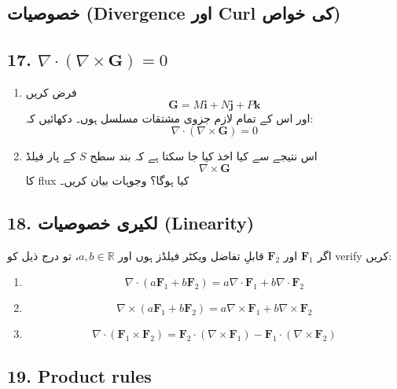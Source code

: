 \begin{enumerate}
\section*{خصوصیات (Divergence اور Curl کی خواص)}

\subsection*{17. \(\nabla \cdot (\nabla \times \mathbf{G}) = 0\)}

\begin{enumerate}
\item[a.] فرض کریں
\[
\mathbf{G} = M\mathbf{i} + N\mathbf{j} + P\mathbf{k}
\]
اور اس کے تمام لازم جزوی مشتقات مسلسل ہوں۔ دکھائیں کہ:
\[
\nabla \cdot (\nabla \times \mathbf{G}) = 0
\]

\item[b.] اس نتیجے سے کیا اخذ کیا جا سکتا ہے کہ بند سطح \( S \) کے پار فیلڈ
\[
\nabla \times \mathbf{G}
\]
کا flux کیا ہوگا؟ وجوہات بیان کریں۔
\end{enumerate}

\bigskip

\subsection*{18. لکیری خصوصیات (Linearity)}

اگر \( \mathbf{F}_1 \) اور \( \mathbf{F}_2 \) قابلِ تفاضل ویکٹر فیلڈز ہوں اور \( a,b \in \mathbb{R} \)، تو درج ذیل کو verify کریں:

\begin{enumerate}
\item[a.]
\[
\nabla \cdot (a\mathbf{F}_1 + b\mathbf{F}_2)
=
a\nabla \cdot \mathbf{F}_1 + b\nabla \cdot \mathbf{F}_2
\]

\item[b.]
\[
\nabla \times (a\mathbf{F}_1 + b\mathbf{F}_2)
=
a\nabla \times \mathbf{F}_1 + b\nabla \times \mathbf{F}_2
\]

\item[c.]
\[
\nabla \cdot (\mathbf{F}_1 \times \mathbf{F}_2)
=
\mathbf{F}_2 \cdot (\nabla \times \mathbf{F}_1)
-
\mathbf{F}_1 \cdot (\nabla \times \mathbf{F}_2)
\]
\end{enumerate}

\bigskip

\subsection*{19. Product rules}


\end{enumerate}
